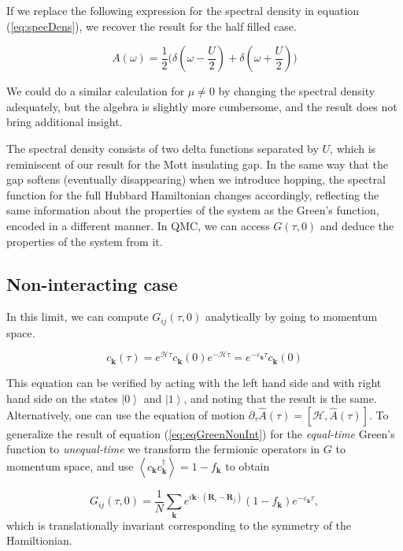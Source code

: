If we replace the following expression for the spectral density in equation (\ref{eq:specDens}), we recover the result for the half filled case.

\begin{equation}
A ( \omega ) = \frac{1}{2} \bigg( \delta ( \omega - \frac{U}{2} ) + \delta ( \omega + \frac{U}{2} ) \bigg)
\end{equation}

We could do a similar calculation for $\mu \neq 0$ by changing the spectral density adequately, but the algebra is slightly more cumbersome, and the result does not bring additional insight.

The spectral density consists of two delta functions separated by $U$, which is reminiscent of our result for the Mott insulating gap.
In the same way that the gap softens (eventually disappearing) when we introduce hopping, the spectral function for the full Hubbard Hamiltonian changes accordingly, reflecting the same information about the properties of the system as the Green's function, encoded in a different manner.
In \acs{QMC}, we can access $G(\tau, 0)$ and deduce the properties of the system from it.

\subsection{Non-interacting case}

In this limit, we can compute $G_{i j} ( \tau, 0 )$ analytically by going to momentum space.

\begin{equation}
c_{\bm k} ( \tau ) = e^{ \mathcal{H} \tau } c_{\bm k} ( 0 ) e^{-\mathcal{H} \tau } = e^{-\varepsilon_{\bm k} \tau } c_{\bm k} ( 0 )
\end{equation}

This equation can be verified by acting with the left hand side and with right hand side on the states $\left| 0 \right\rangle$ and $\left| 1 \right\rangle$, and noting that the result is the same.
Alternatively, one can use the equation of motion $\partial_\tau \hat{A}(\tau) = [ \mathcal{H}, \hat{A} (\tau) ]$.
To generalize the result of equation (\ref{eq:eqGreenNonInt}) for the \emph{equal-time} Green's function to  \emph{unequal-time} we transform the fermionic operators in $G$ to momentum space, and use $\left\langle c_{\bm k} c_{\bm k}^\dagger \right\rangle = 1 - f_{\bm k}$ to obtain

\begin{equation}
G_{i j}(\tau, 0) = \frac{1}{N} \sum_{\bm k} e^{i \bm k \cdot (\bm R_i - \bm R_j )} ( 1 - f_{\bm k} ) e^{-\varepsilon_{\bm k} \tau } ,
\end{equation}
which is translationally invariant corresponding to the symmetry of the Hamiltionian.

